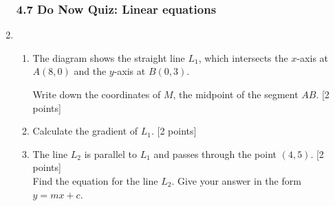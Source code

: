\documentclass[12pt, twoside]{article}
\begin{document}
\begin{enumerate}
    \subsubsection*{4.7 Do Now Quiz: Linear equations}

    \item \begin{enumerate}[itemsep=3cm]
    \item The diagram shows the straight line $L_1$, which intersects the $x$-axis at $A(8, 0)$ and the $y$-axis at $B(0,3)$.
    \begin{center}
    \end{center}
    Write down the coordinates of $M$, the midpoint of the segment $AB$. \hfill [2 points]
    \item Calculate the gradient of $L_1$. \hfill [2 points]
    \item The line $L_2$ is parallel to $L_1$ and passes through the point $(4,5)$. \hfill [2 points]\\[0.5cm]
    Find the equation for the line $L_2$. Give your answer in the form $y=mx+c$.
    \end{enumerate}
    
\end{enumerate}
\end{document}
